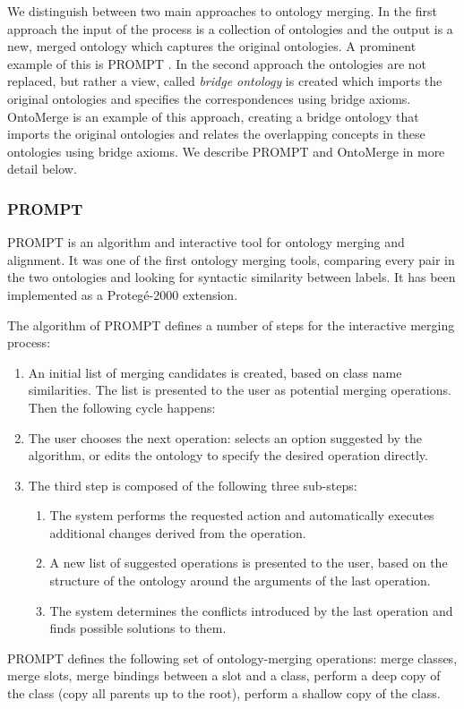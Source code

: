 \documentclass{fast_latex}
\begin{document}
We distinguish between two main approaches to ontology merging. In the
first approach the input of the process is a collection of ontologies
and the output is a new, merged ontology which captures the original
ontologies. A prominent example of this is PROMPT \cite{noy2000prompt}. 
In the second approach the ontologies are not replaced, but
rather a {\textquotesingle}view{\textquotesingle}, called
\textit{bridge ontology} is created which imports the original
ontologies and specifies the correspondences using bridge axioms.
OntoMerge \cite{dou2002ontology_translation} is an example of this approach, creating a
bridge ontology that imports the original ontologies and relates the
overlapping concepts in these ontologies using bridge axioms. We
describe PROMPT and OntoMerge in more detail below. 

\subsubsection{PROMPT}
\label{subsubsec:mediationapproaches_ontologymerging_PROMPT}
PROMPT \cite{noy2000prompt} is an algorithm and interactive tool for
ontology merging and alignment. It was one of the first ontology
merging tools, comparing every pair in the two ontologies and looking
for syntactic similarity between labels. It has been implemented as a
Proteg\'e-2000 extension. 

The algorithm of PROMPT defines a number of steps for the interactive
merging process: 

\begin{enumerate}
\item An initial list of merging candidates is created, based on class
name similarities. The list is presented to the user as potential
merging operations. Then the following cycle happens: 
\item The user chooses the next operation: selects an option suggested
by the algorithm, or edits the ontology to specify the desired
operation directly. 
\item The third step is composed of the following three sub-steps: 

\begin{enumerate}
\item The system performs the requested action and automatically
executes additional changes derived from the operation. 
\item A new list of suggested operations is presented to the user, based
on the structure of the ontology around the arguments of the last
operation. 
\item The system determines the conflicts introduced by the last
operation and finds possible solutions to them. 
\end{enumerate}
\end{enumerate}
PROMPT defines the following set of ontology-merging operations: merge
classes, merge slots, merge bindings between a slot and a class,
perform a deep copy of the class (copy all parents up to the root),
perform a shallow copy of the class. 
\end{document}
